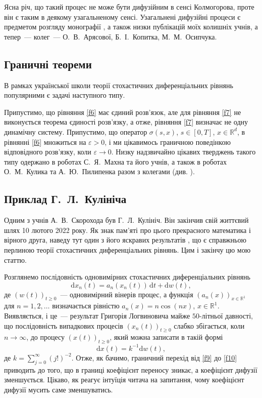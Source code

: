 \documentclass[11pt, reqno]{amsart}
\begin{document}
Ясна річ, що такий процес не може бути дифузійним в сенсі Колмогорова, проте він є таким в деякому узагальненому сенсі. Узагальнені дифузійні процеси є предметом розгляду монографії \cite{b17}, а також низки публікацій моїх колишніх учнів, а тепер~--- колег~--- О.~В.~Арясової, Б.~І.~Копитка, М.~М.~Осипчука.

\subsection{Граничні теореми}
В рамках української школи теорії стохастичних диференціальних рівнянь популярними є задачі наступного типу.


Припустимо, що рівняння \eqref{f6} має єдиний розв'язок, але для рівняння \eqref{f7} не виконується теорема єдиності розв'язку, а отже, рівняння \eqref{f7} визначає не одну динамічну систему. Припустимо, що оператор $\sigma(s, x)$, $s\in[0, T]$, $x\in \mathbb{R}^d$, в рівнянні \eqref{f6} множиться на $\varepsilon>0$, і ми цікавимось граничною поведінкою відповідного розв'язку, коли $\varepsilon\to0$. Низку надзвичайно цікавих тверджень такого типу одержано в роботах С.~Я.~Махна та його учнів, а також в роботах О.~М.~Кулика та А.~Ю.~Пилипенка разом з колегами (див. \cite{b18,b19,b20}).

\subsection{Приклад Г.~Л.~Кулініча}
Одним з учнів А.~В.~Скорохода був Г.~Л.~Кулініч. Він закінчив свій життєвий шлях 10 лютого 2022 року. Як знак пам'яті про цього прекрасного математика і вірного друга, наведу тут один з його яскравих результатів \cite{b21}, що є справжньою перлиною теорії стохастичних диференціальних рівнянь. Цим і закінчу цю мою статтю.

Розглянемо послідовність одновимірних стохастичних диференціальних рівнянь
\begin{equation}
\label{f9}
\mathrm{d}x_n(t)=a_n(x_n(t))\,\mathrm{d}t + \mathrm{d}w(t),
\end{equation}
де $(w(t))_{t\geq0}$~--- одновимірний вінерів процес, а функція $(a_n(x))_{x\in \mathbb{R}^1}$ для $n=1,2,\dots$ визначається рівністю $a_n(x)=n\cos(nx)$, $x\in \mathbb{R}^1$. Виявляється, і це~--- результат Григорія Логвиновича майже $50$-літньої давності, що послідовність випадкових процесів $(x_n(t))_{t\geq0}$ слабко збігається, коли $n\to\infty$, до процесу $(x(t))_{t\geq0}$, який можна записати в такій формі
\begin{equation}
\label{f10}
\mathrm{d}x(t)=k^{-1}\mathrm{d}w(t),
\end{equation}
де $k=\sum_{j=0}^{\infty}(j !)^{-2}$. Отже, як бачимо, граничний перехід від \eqref{f9} до \eqref{f10} приводить до того, що в границі коефіцієнт переносу зникає, а коефіцієнт дифузії зменшується. Цікаво, як реагує інтуїція читача на запитання, чому коефіцієнт дифузії мусить саме зменшуватись.
\end{document}
